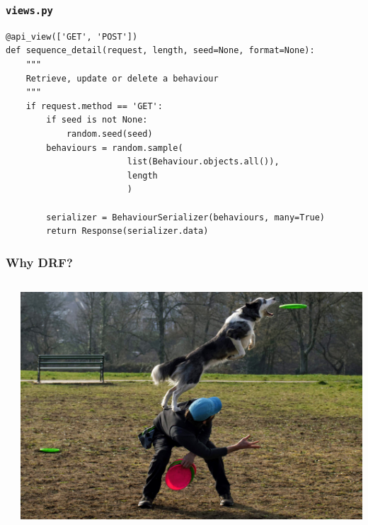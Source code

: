 \documentclass{beamer}
\begin{document}
    \begin{frame}[fragile]
        \frametitle{\texttt{views.py}}
        \small
        \begin{verbatim}
@api_view(['GET', 'POST'])
def sequence_detail(request, length, seed=None, format=None):
    """
    Retrieve, update or delete a behaviour
    """
    if request.method == 'GET':
        if seed is not None:
            random.seed(seed)
        behaviours = random.sample(
                        list(Behaviour.objects.all()), 
                        length
                        )

        serializer = BehaviourSerializer(behaviours, many=True)
        return Response(serializer.data)
        \end{verbatim}
    \end{frame}

    \begin{frame}
        \centering
        \Huge
    \end{frame}

    \begin{frame}
        \frametitle{Why DRF?}
        \begin{columns}
            \begin{column}{.5\textwidth}
            \end{column}
            \begin{column}{.5\textwidth}
                \centering
                \includegraphics[width=\textwidth]{static/back_vault.jpg}
            \end{column}
        \end{columns}
    \end{frame}
\end{document}
